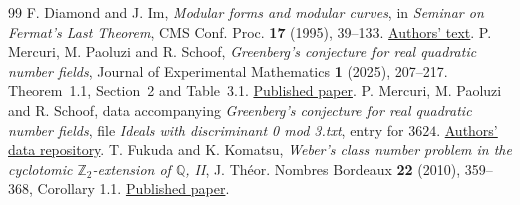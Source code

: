 \documentclass[a4paper,11pt]{article}
\theoremstyle{definition}
\theoremstyle{remark}
\numberwithin{equation}{section}
\begin{document}
\begin{thebibliography}{99}
 F. Diamond and J. Im, \emph{Modular forms and modular curves}, in \emph{Seminar on Fermat's Last Theorem}, CMS Conf. Proc. \textbf{17} (1995), 39--133. \href{https://wstein.org/edu/Fall2003/252/references/diamond-im/Diamond-Im-Modular_forms_and_modular_curves.pdf}{Authors' text}.
 P. Mercuri, M. Paoluzi and R. Schoof, \emph{Greenberg's conjecture for real quadratic number fields}, Journal of Experimental Mathematics \textbf{1} (2025), 207--217. Theorem~1.1, Section~2 and Table~3.1. \href{https://reneschoof.github.io/MPSfinal.pdf}{Published paper}.
 P. Mercuri, M. Paoluzi and R. Schoof, data accompanying \emph{Greenberg's conjecture for real quadratic number fields}, file \emph{Ideals with discriminant 0 mod 3.txt}, entry for \(3624\). \href{https://github.com/mercuri-pietro/Iwasawa-modules}{Authors' data repository}.
 T. Fukuda and K. Komatsu, \emph{Weber's class number problem in the cyclotomic $\mathbb Z_2$-extension of $\mathbb Q$, II}, J. Th\'eor. Nombres Bordeaux \textbf{22} (2010), 359--368, Corollary 1.1. \href{https://www.numdam.org/article/JTNB_2010__22_2_359_0.pdf}{Published paper}.
\end{thebibliography}\endgroup
\end{document}
